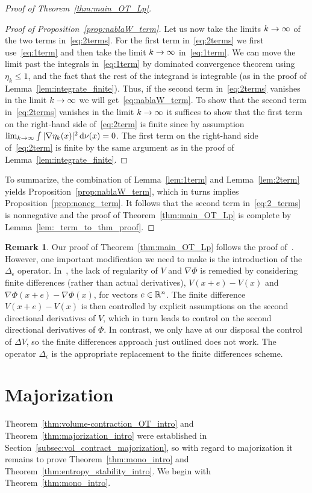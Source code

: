 \documentclass[10pt]{amsart}
\theoremstyle{definition}\newtheorem{defi}[theo]{Definition}\newtheorem{rema}[theo]{Remark}\newtheorem{exam}[theo]{Example}\newtheorem{exem}[theo]{Example}\newtheorem{nota}[theo]{Notation}
\newcommand{\R}{\mathbb R}
\newcommand{\V}{V}
\newcommand{\dd}{n}
\newcommand{\target}{\nu}
\newcommand*\diff{\mathop{}\!\mathrm{d}}
\newcommand{\OT}{\Phi}
\renewcommand*{\to}{\mathchoice{\longrightarrow}{\rightarrow}{\rightarrow}{\rightarrow}}
\let\oldin\in
\renewcommand{\in}{\mathchoice{\oldin}{\oldin}{\,\oldin\,}{\,\oldin\,}}
\begin{document}
\begin{proof}[Proof of Theorem~\ref{thm:main_OT_Lp}]
\begin{proof}[Proof of Proposition~\ref{prop:nablaW_term}]
Let us now take the limits $k\to\infty$ of the two terms in~\eqref{eq:2terms}. For the first term in~\eqref{eq:2terms} we first use~\eqref{eq:1term} and then take the limit $k\to\infty$ in~\eqref{eq:1term}. We can move the limit past the integrals in~\eqref{eq:1term} by dominated convergence theorem using $\eta_k\le 1$, and the fact that the rest of the integrand is integrable (as in the proof of Lemma~\ref{lem:integrate_finite}). Thus, if the second term in~\eqref{eq:2terms} vanishes in the limit $k\to\infty$ we will get~\eqref{eq:nablaW_term}. To show that the second term in~\eqref{eq:2terms} vanishes in the limit $k\to\infty$ it suffices to show that the first term on the right-hand side of~\eqref{eq:2term} is finite since by assumption $\lim_{k\to\infty}\int |\nabla\eta_k(x)|^2 \diff\target(x)=0$. The first term on the right-hand side of~\eqref{eq:2term} is finite by the same argument as in the proof of Lemma~\ref{lem:integrate_finite}.
\end{proof}

To summarize, the combination of Lemma~\ref{lem:1term} and Lemma~\ref{lem:2term} yields Proposition~\ref{prop:nablaW_term}, which in turns implies Proposition~\ref{prop:noneg_term}. It follows that the second term in~\eqref{eq:2_terms} is nonnegative and the proof of Theorem~\ref{thm:main_OT_Lp} is complete by Lemma~\ref{lem:_term_to_thm_proof}.
\end{proof}

\begin{rema}\label{rem:modification}
Our proof of Theorem~\ref{thm:main_OT_Lp} follows the proof of~\cite[Theorem~6.2]{kolesnikov2011mass}. However, one important modification we need to make is the introduction of the $\Delta_{\epsilon}$ operator. In~\cite{kolesnikov2011mass}, the lack of regularity of $\V$ and $\nabla\OT$ is remedied by considering finite differences (rather than actual derivatives), $\V(x+e)-\V(x)$ and $\nabla\OT(x+e)-\nabla\OT(x)$, for vectors $e\in\R^{\dd}$. The finite difference $\V(x+e)-\V(x)$ is then controlled by explicit assumptions on the second directional derivatives of $\V$, which in turn leads to control on the second directional derivatives of $\OT$. In contrast, we only have at our disposal the control of $\Delta \V$, so the finite differences approach just outlined does not work. The operator $\Delta_{\epsilon}$ is the appropriate replacement to the finite differences scheme.
\end{rema}


\section{Majorization}\label{sec:major}
Theorem~\ref{thm:volume-contraction_OT_intro} and Theorem~\ref{thm:majorization_intro} were established in Section~\ref{subsec:vol_contract_majorization}, so with regard to majorization it remains to prove Theorem~\ref{thm:mono_intro} and Theorem~\ref{thm:entropy_stability_intro}. We begin with Theorem~\ref{thm:mono_intro}.
\end{document}
